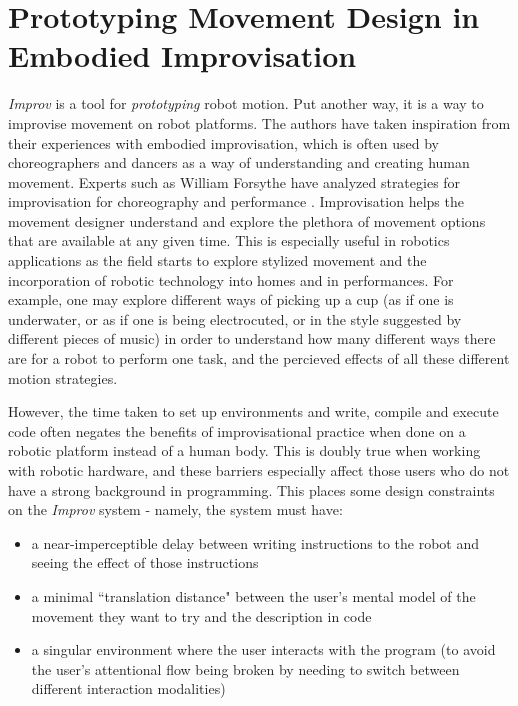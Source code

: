 \documentclass[sigconf]{acmart}
\begin{document}
\section{Prototyping Movement Design in Embodied Improvisation}\label{embodied}

\emph{Improv} is a tool for \emph{prototyping} robot motion. Put another way, it
is a way to improvise movement on robot platforms. The authors have taken
inspiration from their experiences with embodied improvisation, which is often
used by choreographers and dancers as a way of understanding and creating human
movement. Experts such as William Forsythe have analyzed strategies for
improvisation for choreography and performance \cite{forsythe2004improvisation}.
Improvisation helps the movement designer understand and explore the plethora of
movement options that are available at any given time. This is especially useful
in robotics applications as the field starts to explore stylized movement and
the incorporation of robotic technology into homes and in performances. For
example, one may explore different ways of picking up a cup (as if one is
underwater, or as if one is being electrocuted, or in the style suggested by
different pieces of music) in order to understand how many different ways there
are for a robot to perform one task, and the percieved effects of all these
different motion strategies.

However, the time taken to set up environments and write, compile and
execute code often negates the benefits of improvisational practice when done
on a robotic platform instead of a human body. This is
doubly true when working with robotic hardware, and these barriers especially
affect those users who do not have a strong background in programming. This places
some design constraints on the \emph{Improv} system - namely, the system must
have:

\begin{itemize}
\item a near-imperceptible delay between writing instructions to the robot and
seeing the effect of those instructions
\item a minimal ``translation
distance" between the user's mental model of the movement they want to try and
the description in code
\item a singular environment where the
user interacts with the program (to avoid the user's attentional flow being
broken by needing to switch between different interaction modalities)
\end{itemize}
\end{document}
